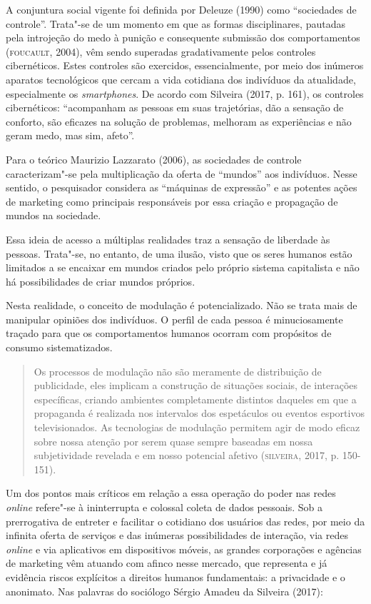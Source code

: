 A conjuntura social vigente foi definida por Deleuze (1990) como
``sociedades de controle''. Trata"-se de um momento em que as formas
disciplinares, pautadas pela introjeção do medo à punição e consequente
submissão dos comportamentos (\textsc{foucault}, 2004), vêm sendo superadas
gradativamente pelos controles cibernéticos. Estes controles são
exercidos, essencialmente, por meio dos inúmeros aparatos tecnológicos
que cercam a vida cotidiana dos indivíduos da atualidade, especialmente
os \emph{smartphones}. De acordo com Silveira (2017, p. 161), os
controles cibernéticos: ``acompanham as pessoas em suas trajetórias, dão
a sensação de conforto, são eficazes na solução de problemas, melhoram
as experiências e não geram medo, mas sim, afeto''.

Para o teórico Maurizio Lazzarato (2006), as sociedades de controle
caracterizam"-se pela multiplicação da oferta de ``mundos'' aos
indivíduos. Nesse sentido, o pesquisador considera as ``máquinas de
expressão'' e as potentes ações de marketing como principais
responsáveis por essa criação e propagação de mundos na sociedade.

Essa ideia de acesso a múltiplas realidades traz a sensação de liberdade
às pessoas. Trata"-se, no entanto, de uma ilusão, visto que os seres
humanos estão limitados a se encaixar em mundos criados pelo próprio
sistema capitalista e não há possibilidades de criar mundos próprios.

Nesta realidade, o conceito de modulação é potencializado. Não se trata
mais de manipular opiniões dos indivíduos. O perfil de cada pessoa é
minuciosamente traçado para que os comportamentos humanos ocorram com
propósitos de consumo sistematizados.

\begin{quote}
Os processos de modulação não são meramente de distribuição de
publicidade, eles implicam a construção de situações sociais, de
interações específicas, criando ambientes completamente distintos
daqueles em que a propaganda é realizada nos intervalos dos espetáculos
ou eventos esportivos televisionados. As tecnologias de modulação
permitem agir de modo eficaz sobre nossa atenção por serem quase sempre
baseadas em nossa subjetividade revelada e em nosso potencial afetivo (\textsc{silveira}, 2017, p. 150-151).
\end{quote}

Um dos pontos mais críticos em relação a essa operação do poder nas
redes \emph{online} refere"-se à ininterrupta e colossal coleta de dados
pessoais. Sob a prerrogativa de entreter e facilitar o cotidiano dos
usuários das redes, por meio da infinita oferta de serviços e das
inúmeras possibilidades de interação, via redes \emph{online} e via aplicativos
em dispositivos móveis, as grandes corporações e agências de marketing
vêm atuando com afinco nesse mercado, que representa e já evidência
riscos explícitos a direitos humanos fundamentais: a privacidade e o
anonimato. Nas palavras do sociólogo Sérgio Amadeu da Silveira (2017):

